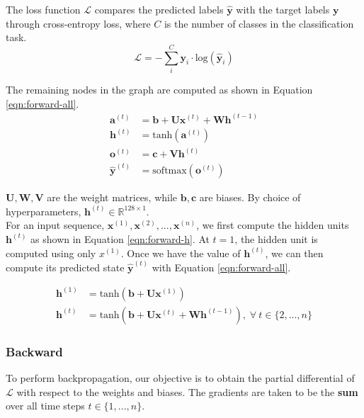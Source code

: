 \documentclass{article}
\begin{document}
The loss function $\mathcal{L}$ compares the predicted labels $\hat{\bm{y}}$ with the target labels $\bm{y}$ through cross-entropy loss, where $C$ is the number of classes in the classification task.
	$$ \mathcal{L} = -\sum_i^C \bm{y}_i \cdot \text{log}(\hat{\bm{y}}_i) $$

The remaining nodes in the graph are computed as shown in Equation \ref{eqn:forward-all}.
\begin{equation}
\label{eqn:forward-all}
\begin{split}
	\bm{a}^{(t)} &= \bm{b} + \bm{U}\bm{x}^{(t)} + \bm{W}\bm{h}^{(t-1)} \\
	\bm{h}^{(t)} &= \text{tanh}(\bm{a}^{(t)}) \\
	\bm{o}^{(t)} &= \bm{c} + \bm{V}\bm{h}^{(t)} \\
	\hat{\bm{y}}^{(t)} &= \text{softmax}(\bm{o}^{(t)})
\end{split}
\end{equation}

$\bm{U}, \bm{W}, \bm{V}$ are the weight matrices, while $\bm{b}, \bm{c}$ are biases. By choice of hyperparameters, $\bm{h}^{(t)} \in \mathbb{R}^{128\times1}$. \\

For an input sequence, $\bm{x}^{(1)}, \bm{x}^{(2)}, ..., \bm{x}^{(n)}$, we first compute the hidden units $\bm{h}^{(t)}$ as shown in Equation \ref{eqn:forward-h}. At $t=1$, the hidden unit is computed using only $x^{(1)}$. Once we have the value of $\bm{h}^{(t)}$, we can then compute its predicted state $\hat{\bm{y}}^{(t)}$ with Equation \ref{eqn:forward-all}.

\begin{equation}
\label{eqn:forward-h}
\begin{split}
	\bm{h}^{(1)} &= \text{tanh}(\bm{b} + \bm{U}\bm{x}^{(1)}) \\
	\bm{h}^{(t)} &= \text{tanh}(\bm{b} + \bm{U}\bm{x}^{(t)} + \bm{W}\bm{h}^{(t-1)}),\;
		\forall\: t \in \{2, ..., n\}
\end{split}
\end{equation}

\subsubsection{Backward}
To perform backpropagation, our objective is to obtain the partial differential of $\mathcal{L}$ with respect to the weights and biases. The gradients are taken to be the \textbf{sum} over all time steps $t \in \{1, ..., n\}$.
\end{document}
